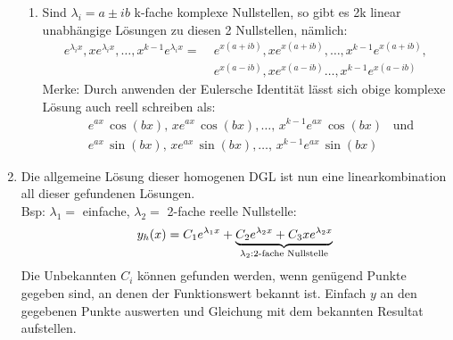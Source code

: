 \begin{enumerate}
\begin{enumerate}[leftmargin=0.3cm]
		\item Sind $\lambda_i = a \pm ib$ k-fache komplexe Nullstellen, so gibt es 2k linear unabhängige Lösungen zu diesen 2 Nullstellen, nämlich:
		{\small\begin{align*}
				e^{\lambda_i x}, x e^{\lambda_i x}, \ldots, x^{k-1} e^{\lambda_i x}
				= \; &e^{x(a+ib)}, x e^{x(a+ib)}, \ldots, x^{k-1} e^{x(a+ib)}, \\
				&e^{x(a-ib)}, x e^{x(a-ib)} \ldots, x^{k-1} e^{x(a-ib)}
		\end{align*}}Merke: Durch anwenden der Eulersche Identität lässt sich obige komplexe Lösung auch reell schreiben als:
		\vspace{3pt}
		\begin{align*}
			&e^{a x} \, \cos(bx), \, x e^{a x} \, \cos(bx), \ldots, \, x^{k-1} e^{a x} \, \cos(bx) \hspace{10pt} \text{und}\\
			&e^{a x} \, \sin(bx), \, x e^{a x} \, \sin(bx), \ldots, \, x^{k-1} e^{a x} \, \sin(bx)
		\end{align*}
	\end{enumerate}
	\vspace{3pt}
	\item Die allgemeine Lösung dieser homogenen DGL ist nun eine linearkombination all dieser gefundenen Lösungen. \\
	Bsp: $\lambda_1 =$ einfache, $\lambda_2 = $ 2-fache reelle Nullstelle:
	\begin{align*}
	 y_h(x) = C_1 e^{\lambda_1 x} + \underset{\lambda_2: \text{2-fache Nullstelle}}{\underbrace{C_2 e^{\lambda_2 x} + C_3 x e^{\lambda_2 x}}}
	\end{align*}
	Die Unbekannten $C_i$ können gefunden werden, wenn genügend Punkte gegeben sind, an denen der Funktionswert bekannt ist. Einfach $y$ an den gegebenen Punkte auswerten und Gleichung mit dem bekannten Resultat aufstellen.
\end{enumerate}

